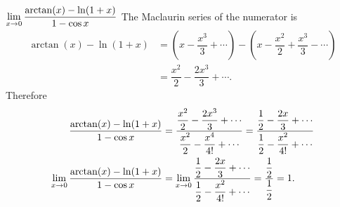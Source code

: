 \begin{ex}
    $\displaystyle\lim_{x \to 0} \dfrac{\arctan(x) - \ln (1+x)}{1 - \cos x}$
    The Maclaurin series of the numerator is 
    \begin{align*}
        \arctan(x) - \ln (1+x) &= \left( x - \dfrac{x^3}{3} + \cdots \right) - \left( x - \dfrac{x^2}{2} + \dfrac{x^3}{3} - \cdots \right) \\
        &= \dfrac{x^2}{2} - \dfrac{2x^3}{3} + \cdots.
    \end{align*}
    Therefore
    \begin{align*}    
        \dfrac{\arctan(x) - \ln (1+x)}{1 - \cos x} &= \dfrac{ \dfrac{x^2}{2} - \dfrac{2x^3}{3} + \cdots }{\dfrac{x^2}{2} - \dfrac{x^4}{4!} + \cdots} =  \dfrac{ \dfrac{1}{2} - \dfrac{2x}{3} + \cdots }{\dfrac{1}{2} - \dfrac{x^2}{4!} + \cdots} \\
        \displaystyle\lim_{x \to 0} \dfrac{\arctan(x) - \ln (1+x)}{1 - \cos x} &= \displaystyle\lim_{x \to 0} \dfrac{ \dfrac{1}{2} - \dfrac{2x}{3} + \cdots }{\dfrac{1}{2} - \dfrac{x^2}{4!} + \cdots} = \dfrac{\dfrac{1}{2}}{\dfrac{1}{2}} = 1.
    \end{align*}
\end{ex}